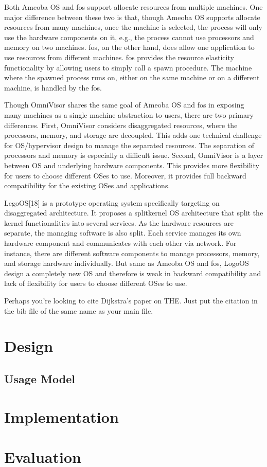 \documentclass[twocolumn]{article}
\begin{document}
    Both Ameoba OS and fos support allocate resources from multiple machines. One major difference between these two is that, though Ameoba OS supports allocate resources from many machines, once the machine is selected, the process will only use the hardware components on it, e.g., the process cannot use processors and memory on two machines.  fos, on the other hand, does allow one application to use resources from different machines. fos provides the resource elasticity functionality by allowing users to simply call a spawn procedure. The machine where the spawned process runs on, either on the same machine or on a different machine, is handled by the fos. \par
    Though OmniVisor shares the same goal of Ameoba OS and fos in exposing many machines as a single machine abstraction to users, there are two primary differences. First, OmniVisor considers disaggregated resources, where the processors, memory, and storage are decoupled. This adds one technical challenge for OS/hypervisor design to manage the separated resources. The separation of processors and memory is especially a difficult issue. Second, OmniVisor is a layer between OS and underlying hardware components. This provides more flexibility for users to choose different OSes to use. Moreover, it provides full backward compatibility for the existing OSes and applications. \par
    LegoOS[18] is a prototype operating system specifically targeting on disaggregated architecture. It proposes a splitkernel OS architecture that split the kernel functionalities into several services. As the hardware resources are separate, the managing software is also split. Each service manages its own hardware component and communicates with each other via network. For instance, there are different software components to manage processors, memory, and storage hardware individually. But same as Ameoba OS and fos, LogoOS design a completely new OS and therefore is weak in backward compatibility and lack of flexibility for users to choose different OSes to use. \par

Perhaps you're looking to cite Dijkstra's paper on
THE\cite{DBLP:journals/cacm/Dijkstra68}.  Just put the citation in the bib file of the same name as your main file.

\section{Design}

\subsection{Usage Model}

\section{Implementation}
\section{Evaluation}

{}

\end{document}
